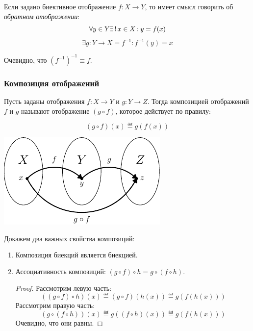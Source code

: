 Если задано биективное отображение $f\colon X\to Y$, то имеет смысл говорить об
\emph{обратном отображении}:
$$\forall y\in Y\exists\,!\, x\in X\colon y=f(x)$$
$$\exists g\colon Y\to X=f^{-1}\colon f^{-1}(y)=x$$

Очевидно, что $\left(f^{-1}\right)^{-1}\equiv f$.

\subsubsection{Композиция отображений}

\begin{df}
	Пусть заданы отображения $f\colon X\to Y$ и $g\colon Y\to Z$. Тогда композицией
	отображений $f$ и $g$ называют отображение $(g\circ f)$, которое действует по правилу:

	$$(g\circ f)(x)\eqdef g(f(x))$$

	\begin{center}
		\includegraphics{graph/mapping-composition}
	\end{center}
\end{df}

Докажем два важных свойства композиций:

\begin{enumerate}
	\item Композиция биекций является биекцией.
	\item Ассоциативность композиций: $(g\circ f)\circ h=g\circ(f\circ h)$.
		\begin{proof}
			Рассмотрим левую часть:
			$$((g\circ f)\circ h)(x)\eqdef(g\circ f)(h(x))\eqdef g(f(h(x)))$$
			Рассмотрим правую часть:
			$$(g\circ(f\circ h))(x)\eqdef g((f\circ h)(x))\eqdef g(f(h(x)))$$
			Очевидно, что они равны.
		\end{proof}
\end{enumerate}

